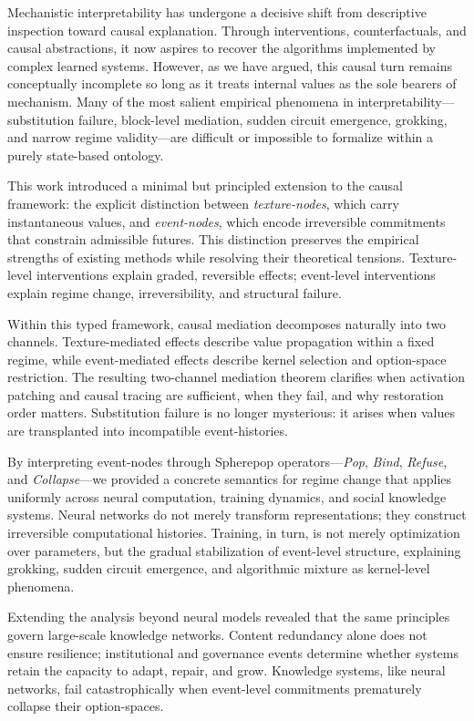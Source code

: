 \documentclass[11pt]{article}
\theoremstyle{remark}
\begin{document}
Mechanistic interpretability has undergone a decisive shift from
descriptive inspection toward causal explanation. Through
interventions, counterfactuals, and causal abstractions, it now aspires
to recover the algorithms implemented by complex learned systems.
However, as we have argued, this causal turn remains conceptually
incomplete so long as it treats internal values as the sole bearers of
mechanism. Many of the most salient empirical phenomena in
interpretability—substitution failure, block-level mediation, sudden
circuit emergence, grokking, and narrow regime validity—are difficult
or impossible to formalize within a purely state-based ontology.

This work introduced a minimal but principled extension to the causal
framework: the explicit distinction between \emph{texture-nodes},
which carry instantaneous values, and \emph{event-nodes}, which encode
irreversible commitments that constrain admissible futures. This
distinction preserves the empirical strengths of existing methods
while resolving their theoretical tensions. Texture-level
interventions explain graded, reversible effects; event-level
interventions explain regime change, irreversibility, and structural
failure.

Within this typed framework, causal mediation decomposes naturally
into two channels. Texture-mediated effects describe value propagation
within a fixed regime, while event-mediated effects describe kernel
selection and option-space restriction. The resulting two-channel
mediation theorem clarifies when activation patching and causal
tracing are sufficient, when they fail, and why restoration order
matters. Substitution failure is no longer mysterious: it arises when
values are transplanted into incompatible event-histories.

By interpreting event-nodes through Spherepop operators—\emph{Pop},
\emph{Bind}, \emph{Refuse}, and \emph{Collapse}—we provided a concrete
semantics for regime change that applies uniformly across neural
computation, training dynamics, and social knowledge systems. Neural
networks do not merely transform representations; they construct
irreversible computational histories. Training, in turn, is not merely
optimization over parameters, but the gradual stabilization of
event-level structure, explaining grokking, sudden circuit emergence,
and algorithmic mixture as kernel-level phenomena.

Extending the analysis beyond neural models revealed that the same
principles govern large-scale knowledge networks. Content redundancy
alone does not ensure resilience; institutional and governance events
determine whether systems retain the capacity to adapt, repair, and
grow. Knowledge systems, like neural networks, fail catastrophically
when event-level commitments prematurely collapse their option-spaces.
\end{document}
